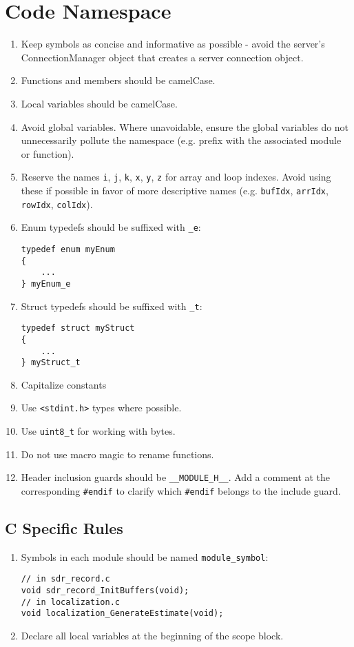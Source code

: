 \documentclass{article}
\begin{document}
\section{Code Namespace}
\begin{enumerate}
    \item Keep symbols as concise and informative as possible - avoid the server’s ConnectionManager object that creates a server connection object.
    \item Functions and members should be camelCase.
    \item Local variables should be camelCase.
    \item Avoid global variables.  Where unavoidable, ensure the global variables do not unnecessarily pollute the namespace (e.g. prefix with the associated module or function).
    \item Reserve the names \lstinline{i}, \lstinline{j}, \lstinline{k}, \lstinline{x}, \lstinline{y}, \lstinline{z} for array and loop indexes.  Avoid using these if possible in favor of more descriptive names (e.g. \lstinline{bufIdx}, \lstinline{arrIdx}, \lstinline{rowIdx}, \lstinline{colIdx}).
    \item Enum typedefs should be suffixed with \lstinline{_e}:
\begin{lstlisting}
typedef enum myEnum
{
    ...
} myEnum_e
\end{lstlisting}
    \item Struct typedefs should be suffixed with \lstinline{_t}:
\begin{lstlisting}
typedef struct myStruct
{
    ...
} myStruct_t
\end{lstlisting}
    \item Capitalize constants
    \item Use \lstinline{<stdint.h>} types where possible.
    \item Use \lstinline{uint8_t} for working with bytes.
    \item Do not use macro magic to rename functions.
    \item Header inclusion guards should be \lstinline{__MODULE_H__}.  Add a comment at the corresponding \lstinline{#endif} to clarify which \lstinline{#endif} belongs to the include guard.
\end{enumerate}

\subsection{C Specific Rules}
\begin{enumerate}
    \item Symbols in each module should be named \lstinline{module_symbol}:
\begin{lstlisting}
// in sdr_record.c
void sdr_record_InitBuffers(void);
// in localization.c
void localization_GenerateEstimate(void);
\end{lstlisting}
    \item Declare all local variables at the beginning of the scope block.
\end{enumerate}
\end{document}

